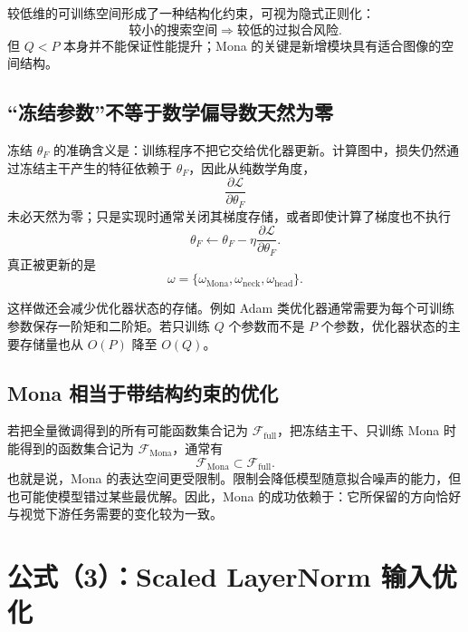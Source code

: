 \documentclass[UTF8,12pt,a4paper,fontset=none]{ctexart}
\newcommand{\Loss}{\mathcal{L}}
\begin{document}
较低维的可训练空间形成了一种结构化约束，可视为隐式正则化：
\begin{equation}
 \text{较小的搜索空间}
 \Longrightarrow
 \text{较低的过拟合风险}.
\end{equation}
但 $Q<P$ 本身并不能保证性能提升；Mona 的关键是新增模块具有适合图像的空间结构。



\subsection{“冻结参数”不等于数学偏导数天然为零}

冻结 $\theta_F$ 的准确含义是：训练程序不把它交给优化器更新。计算图中，损失仍然通过冻结主干产生的特征依赖于 $\theta_F$，因此从纯数学角度，
\begin{equation}
 \frac{\partial\Loss}{\partial\theta_F}
\end{equation}
未必天然为零；只是实现时通常关闭其梯度存储，或者即使计算了梯度也不执行
\begin{equation}
 \theta_F\leftarrow\theta_F-\eta\frac{\partial\Loss}{\partial\theta_F}.
\end{equation}
真正被更新的是
\begin{equation}
 \omega=\{\omega_{\mathrm{Mona}},\omega_{\mathrm{neck}},\omega_{\mathrm{head}}\}.
\end{equation}

这样做还会减少优化器状态的存储。例如 Adam 类优化器通常需要为每个可训练参数保存一阶矩和二阶矩。若只训练 $Q$ 个参数而不是 $P$ 个参数，优化器状态的主要存储量也从 $O(P)$ 降至 $O(Q)$。

\subsection{Mona 相当于带结构约束的优化}

若把全量微调得到的所有可能函数集合记为 $\mathcal{F}_{\mathrm{full}}$，把冻结主干、只训练 Mona 时能得到的函数集合记为 $\mathcal{F}_{\mathrm{Mona}}$，通常有
\begin{equation}
 \mathcal{F}_{\mathrm{Mona}}\subset\mathcal{F}_{\mathrm{full}}.
\end{equation}
也就是说，Mona 的表达空间更受限制。限制会降低模型随意拟合噪声的能力，但也可能使模型错过某些最优解。因此，Mona 的成功依赖于：它所保留的方向恰好与视觉下游任务需要的变化较为一致。

\section{公式（3）：Scaled LayerNorm 输入优化}
\end{document}
